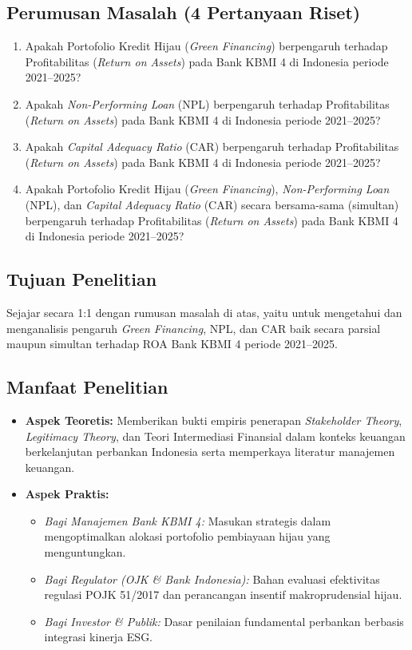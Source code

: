 \documentclass[11pt,a4paper]{article}
\begin{document}
\subsection{Perumusan Masalah (4 Pertanyaan Riset)}
\begin{enumerate}
    \item Apakah Portofolio Kredit Hijau (\textit{Green Financing}) berpengaruh terhadap Profitabilitas (\textit{Return on Assets}) pada Bank KBMI 4 di Indonesia periode 2021--2025?
    \item Apakah \textit{Non-Performing Loan} (NPL) berpengaruh terhadap Profitabilitas (\textit{Return on Assets}) pada Bank KBMI 4 di Indonesia periode 2021--2025?
    \item Apakah \textit{Capital Adequacy Ratio} (CAR) berpengaruh terhadap Profitabilitas (\textit{Return on Assets}) pada Bank KBMI 4 di Indonesia periode 2021--2025?
    \item Apakah Portofolio Kredit Hijau (\textit{Green Financing}), \textit{Non-Performing Loan} (NPL), dan \textit{Capital Adequacy Ratio} (CAR) secara bersama-sama (simultan) berpengaruh terhadap Profitabilitas (\textit{Return on Assets}) pada Bank KBMI 4 di Indonesia periode 2021--2025?
\end{enumerate}

\subsection{Tujuan Penelitian}
Sejajar secara 1:1 dengan rumusan masalah di atas, yaitu untuk mengetahui dan menganalisis pengaruh \textit{Green Financing}, NPL, dan CAR baik secara parsial maupun simultan terhadap ROA Bank KBMI 4 periode 2021--2025.

\subsection{Manfaat Penelitian}
\begin{itemize}
    \item \textbf{Aspek Teoretis:} Memberikan bukti empiris penerapan \textit{Stakeholder Theory}, \textit{Legitimacy Theory}, dan Teori Intermediasi Finansial dalam konteks keuangan berkelanjutan perbankan Indonesia serta memperkaya literatur manajemen keuangan.
    \item \textbf{Aspek Praktis:}
    \begin{itemize}
        \item \textit{Bagi Manajemen Bank KBMI 4:} Masukan strategis dalam mengoptimalkan alokasi portofolio pembiayaan hijau yang menguntungkan.
        \item \textit{Bagi Regulator (OJK \& Bank Indonesia):} Bahan evaluasi efektivitas regulasi POJK 51/2017 dan perancangan insentif makroprudensial hijau.
        \item \textit{Bagi Investor \& Publik:} Dasar penilaian fundamental perbankan berbasis integrasi kinerja ESG.
    \end{itemize}
\end{itemize}
\end{document}
